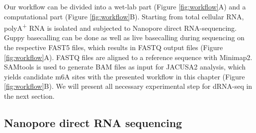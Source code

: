 \documentclass[times, 11pt, a4paper]{article}
\begin{document}
Our workflow can be divided into a wet-lab part (Figure \ref{fig:workflow}A) and a computational part (Figure \ref{fig:workflow}B). Starting from total cellular RNA, polyA\textsuperscript{+} RNA is isolated and subjected to Nanopore direct RNA-sequencing. Guppy basecalling can be done as well as live basecalling during sequencing on the respective FAST5 files, which results in FASTQ output files (Figure \ref{fig:workflow}A). FASTQ files are aligned to a reference sequence with Minimap2. SAMtools is used to generate BAM files as input for JACUSA2 analysis, which yields candidate m6A sites with the presented workflow in this chapter (Figure \ref{fig:workflow}B).
We will present all necessary experimental step for dRNA-seq in the next section.

\subsection*{Nanopore direct RNA sequencing}
\end{document}
